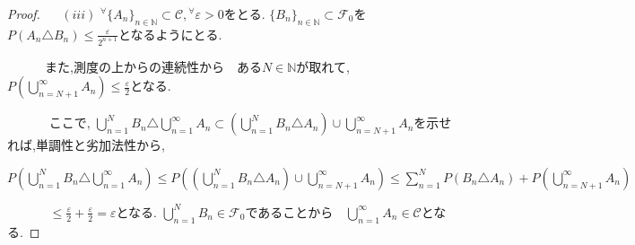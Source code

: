 \documentclass{jsarticle}
\begin{document}
\begin{proof}
$\quad$ $(iii)$ ${}^\forall \lbrace A_{n} \rbrace_{n \in \mathbb{N}} \subset \mathcal{C}, {}^\forall \varepsilon > 0$をとる. $\lbrace B_{n} \rbrace_{n \in \mathbb{N}} \subset \mathcal{F}_{0}$を$P(A_{n} \triangle B_{n}) \le \frac{\varepsilon}{2^{n+1}} $となるようにとる.\par 
$\quad \qquad$また,測度の上からの連続性から　ある$N \in \mathbb{N}$が取れて, $P( \displaystyle\bigcup_{n=N+1}^{\infty} A_{n}) \le \frac{\varepsilon}{2}$となる.\par$\quad \qquad$ ここで, $\displaystyle\bigcup_{n=1}^{N} B_{n} \triangle \displaystyle\bigcup_{n=1}^{\infty} A_{n} \subset (\displaystyle\bigcup_{n=1}^{N} B_{n} \triangle A_{n}) \cup \displaystyle\bigcup_{n=N+1}^{\infty} A_{n}$を示せれば,単調性と劣加法性から,\par $\quad \qquad$ $P(\displaystyle\bigcup_{n=1}^{N} B_{n} \triangle \displaystyle\bigcup_{n=1}^{\infty} A_{n}) \le P((\displaystyle\bigcup_{n=1}^{N} B_{n} \triangle A_{n}) \cup \displaystyle\bigcup_{n=N+1}^{\infty} A_{n}) \le  \displaystyle\sum_{n=1}^{N}P(B_{n} \triangle A_{n}) + P(\displaystyle\bigcup_{n=N+1}^{\infty} A_{n})$ \par $\quad \qquad$ $\le \frac{\varepsilon}{2} + \frac{\varepsilon}{2} = \varepsilon $となる. $\displaystyle\bigcup_{n=1}^{N} B_{n} \in \mathcal{F}_{0}$であることから　$\displaystyle\bigcup_{n=1}^{\infty} A_{n} \in \mathcal{C}$となる.


\end{proof}
\end{document}
